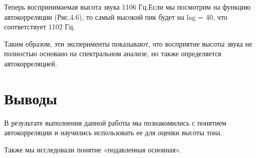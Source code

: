 \documentclass[a4paper,12pt]{report}
\begin{document}
    Теперь воспринимаемая высота звука 1106 Гц.Если мы посмотрим на функцию автокорреляции (Рис.4.6), то самый высокий пик будет на lag = 40, что соответствует 1102 Гц.
    
    Таким образом, эти эксперименты показывают, что восприятие высоты звука не полностью основано на спектральном анализе, но также определяется автокорреляцией.
    
\chapter{Выводы}
    В результате выполнения данной работы мы познакомились с понятием автокорреляции и научились использовать ее для оценки высоты тона.
    
    Также мы исследовали понятие «подавленная основная». 
\end{document}

